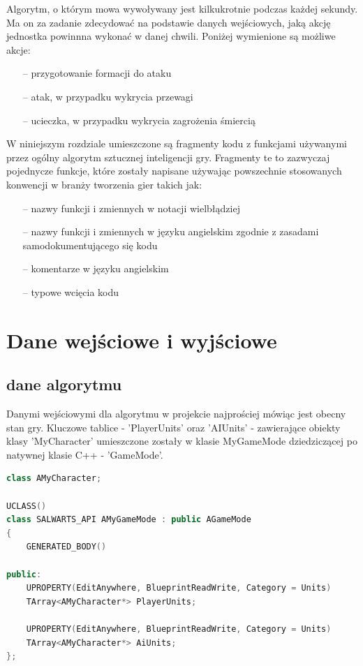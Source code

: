 \documentclass[12pt]{report}
\begin{document}
Algorytm, o którym mowa wywoływany jest kilkukrotnie podczas każdej sekundy. Ma on za zadanie zdecydować na podstawie danych wejściowych, jaką akcję jednostka powinnna wykonać w danej chwili. Poniżej wymienione są możliwe akcje:
\begin{itemize}
\item[--] przygotowanie formacji do ataku
\item[--] atak, w przypadku wykrycia przewagi
\item[--] ucieczka, w przypadku wykrycia zagrożenia śmiercią
\end{itemize}

W niniejszym rozdziale umieszczone są fragmenty kodu z funkcjami używanymi przez ogólny algorytm sztucznej inteligencji gry. Fragmenty te to zazwyczaj pojednycze funkcje, które zostały napisane używając powszechnie stosowanych konwencji w branży tworzenia gier takich jak:
\begin{itemize}
\item[--] nazwy funkcji i zmiennych w notacji wielbłądziej
\item[--] nazwy funkcji i zmiennych w języku angielskim zgodnie z zasadami samodokumentującego się kodu
\item[--] komentarze w języku angielskim
\item[--] typowe wcięcia kodu
\end{itemize}

\section{Dane wejściowe i wyjściowe}
\subsection{dane algorytmu}
Danymi wejściowymi dla algorytmu w projekcie najprościej mówiąc jest obecny stan gry. Kluczowe tablice - 'PlayerUnits' oraz 'AIUnits' - zawierające obiekty klasy 'MyCharacter' umieszczone zostały w klasie MyGameMode dziedziczącej po natywnej klasie C++ - 'GameMode'. 

\begin{lstlisting}[language=C++, backgroundcolor=\color{black!5}, basicstyle=\footnotesize, caption=Klasa AMyGameMode.h.]
   class AMyCharacter;

UCLASS()
class SALWARTS_API AMyGameMode : public AGameMode
{
	GENERATED_BODY()

public:
	UPROPERTY(EditAnywhere, BlueprintReadWrite, Category = Units)
	TArray<AMyCharacter*> PlayerUnits;

	UPROPERTY(EditAnywhere, BlueprintReadWrite, Category = Units)
	TArray<AMyCharacter*> AiUnits;
};
\end{lstlisting}
\end{document}
